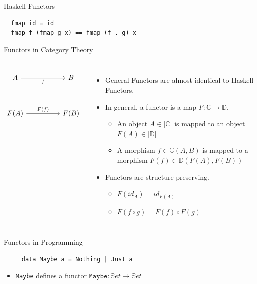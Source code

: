 \documentclass[aspectratio=169]{beamer} %
\newcommand{\bC}{\mathbb{C}}
\newcommand{\bD}{\mathbb{D}}
\begin{document}
{\begin{frame}[fragile]{Haskell Functors}
\begin{itemize}
  \pause \begin{verbatim}
  fmap id = id
  fmap f (fmap g x) == fmap (f . g) x
 \end{verbatim}
\end{itemize}
\end{frame}
%
%
%
\begin{frame}[fragile]{Functors in Category Theory}
\begin{columns}
\[\begin{tikzcd}
	A && B \\
	\\
	{F(A)} && {F(B)}
	\arrow["f"', from=1-1, to=1-3]
	\arrow["{F(f)}", from=3-1, to=3-3]
\end{tikzcd}\]
\begin{itemize}
 \item General Functors are almost identical to Haskell Functors.
 \pause\item In general, a functor is a map $F : \bC \to \bD$.
 \begin{itemize}
  \pause\item An object $A \in |\bC|$ is mapped to an object $F(A) \in |\bD|$
  \pause\item A morphism $f \in \bC(A,B)$ is mapped to a morphism $F(f) \in \bD(F(A), F(B))$
 \end{itemize}
 \pause\item Functors are structure preserving.
 \begin{itemize}
  \pause\item $F(id_A) = id_{F(A)}$
  \pause\item $F(f \circ g) = F(f) \circ F(g)$
 \end{itemize}
\end{itemize}
\end{columns}
\end{frame}
\iffalse
\begin{frame}[fragile]{Functors in Programming}
 \begin{verbatim}
     data Maybe a = Nothing | Just a
 \end{verbatim}
 \begin{itemize}
  \item \texttt{Maybe} defines a functor $\texttt{Maybe} : \mathbb{S}et \to \mathbb{S}et$

\end{itemize}
\end{frame}}
\end{document}
